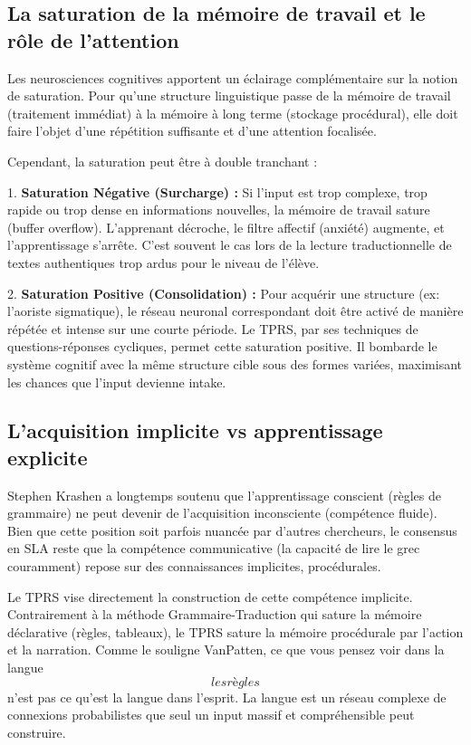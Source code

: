 \subsection{La saturation de la mémoire de travail et le rôle de l'attention}

Les neurosciences cognitives apportent un éclairage complémentaire sur la notion de saturation. Pour
qu'une structure linguistique passe de la mémoire de travail (traitement immédiat) à la mémoire à
long terme (stockage procédural), elle doit faire l'objet d'une répétition suffisante et d'une
attention focalisée.\cite{III-2-3-ref8}

Cependant, la saturation peut être à double tranchant :

1. \textbf{Saturation Négative (Surcharge) :} Si l'input est trop complexe, trop rapide ou trop
dense en informations nouvelles, la mémoire de travail sature (\og buffer overflow\fg{}).
L'apprenant décroche, le filtre affectif (anxiété) augmente, et l'apprentissage s'arrête. C'est
souvent le cas lors de la lecture traductionnelle de textes authentiques trop ardus pour le niveau
de l'élève.\cite{III-2-3-ref10}

2. \textbf{Saturation Positive (Consolidation) :} Pour acquérir une structure (ex: l'aoriste
sigmatique), le réseau neuronal correspondant doit être activé de manière répétée et intense sur une
courte période. Le TPRS, par ses techniques de questions-réponses cycliques, permet cette saturation
positive. Il bombarde le système cognitif avec la même structure cible sous des formes variées,
maximisant les chances que l'input devienne intake.\cite{III-2-3-ref12}



\subsection{L'acquisition implicite vs apprentissage explicite}

Stephen Krashen a longtemps soutenu que l'apprentissage conscient (règles de grammaire) ne peut
devenir de l'acquisition inconsciente (compétence fluide).\cite{III-2-3-ref3} Bien que cette
position soit parfois nuancée par d'autres chercheurs, le consensus en SLA reste que la compétence
communicative (la capacité de lire le grec couramment) repose sur des connaissances implicites,
procédurales.

Le TPRS vise directement la construction de cette compétence implicite. Contrairement à la méthode
Grammaire-Traduction qui sature la mémoire déclarative (règles, tableaux), le TPRS sature la mémoire
procédurale par l'action et la narration. Comme le souligne VanPatten, \og ce que vous pensez voir
dans la langue \[les règles\] n'est pas ce qu'est la langue dans l'esprit\fg{}.\cite{III-2-3-ref15}
La langue est un réseau complexe de connexions probabilistes que seul un input massif et
compréhensible peut construire.



